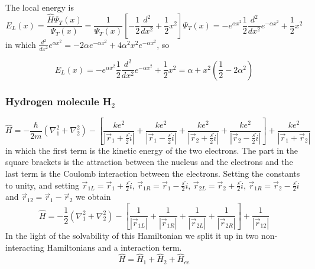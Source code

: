 \documentclass{article}
\begin{document}
The local energy is \begin{equation}
 E_L(x)=\frac{\hat{H}\Psi_T(x)}{\Psi_T(x)}=\frac{1}{\Psi_T(x)} \left[ -\frac12 \frac{d^2}{dx^2}+\frac12 x^2 \right] \Psi_T(x)= -e^{\alpha x^2}\frac12 \frac{d^2}{dx^2}e^{-\alpha x^2}+\frac12 x^2
\end{equation}
in which $\frac{d^2}{dx^2}e^{\alpha x^2}=-2\alpha e^{-\alpha x^2}+4\alpha^2x^2e^{-\alpha x^2}$, so

\begin{equation}
 E_L(x)= -e^{\alpha x^2}\frac12 \frac{d^2}{dx^2}e^{-\alpha x^2}+\frac12 x^2=\alpha+ x^2 \left(\frac12 - 2\alpha^2 \right)
\end{equation}

\subsubsection{Hydrogen molecule H$_2$}

\begin{equation}
 \hat{H}=-\frac{\hbar}{2m}\left( \nabla_1^2 + \nabla_2^2 \right) - \left[ \frac{ke^2}{\left| \vec{r}_1 + \frac{s}{2} \hat{i} \right|} + \frac{ke^2}{\left| \vec{r}_1 - \frac{s}{2} \hat{i} \right|}  +\frac{ke^2}{\left| \vec{r}_2 + \frac{s}{2} \hat{i} \right|}  +\frac{ke^2}{\left| \vec{r}_2 - \frac{s}{2} \hat{i} \right|} \right] +\frac{ke^2}{\left| \vec{r}_1 + \vec{r}_2 \right|} 
\end{equation}
in which the first term is the kinetic energy of the two electrons. The part in the square brackets is the attraction between the nucleus and the electrons and the last term is the Coulomb interaction between the electrons. Setting the constants to unity, and setting $\vec{r}_{1L} = \vec{r}_1 + \frac{s}{2} \hat{i}$, $\vec{r}_{1R} = \vec{r}_1 - \frac{s}{2} \hat{i}$, $\vec{r}_{2L} = \vec{r}_2 + \frac{s}{2} \hat{i}$, $\vec{r}_{1R} = \vec{r}_2 - \frac{s}{2} \hat{i}$ and $\vec{r}_{12} = \vec{r}_1 -\vec{r}_2$ we obtain
\begin{equation}
\hat{H}=-\frac{1}{2}\left( \nabla_1^2 + \nabla_2^2 \right) - \left[ \frac{1}{|\vec{r}_{1L}|} +\frac{1}{|\vec{r}_{1R}|}+\frac{1}{|\vec{r}_{2L}|}+\frac{1}{|\vec{r}_{2R}|} \right] +\frac{1}{\left| \vec{r}_{12} \right|} 
\end{equation}
In the light of the solvability of this Hamiltonian we split it up in two non-interacting Hamiltonians and a interaction term.
\begin{equation}
 \hat{H}=\hat{H}_1 + \hat{H}_2 + \hat{H}_{ee}
\end{equation}
\end{document}
